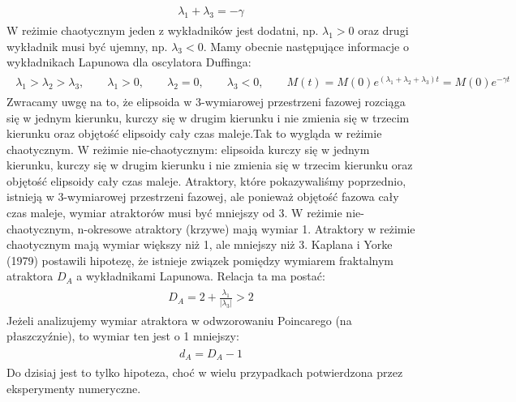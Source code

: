 \documentclass[a4paper,12pt,polish]{sphinxmanual}
\begin{document}
\label{ch2/chII012:equation-eqn16}\begin{gather}
\begin{split}\lambda_1 + \lambda_3 = -\gamma\end{split}\label{ch2/chII012-eqn16}
\end{gather}
W reżimie chaotycznym jeden z wykładników jest dodatni, np. $\lambda_1 >0$ oraz drugi wykładnik musi być ujemny, np. $\lambda_3 < 0$.  Mamy obecnie następujące informacje o wykładnikach Lapunowa dla oscylatora  Duffinga:
\label{ch2/chII012:equation-eqn17}\begin{gather}
\begin{split}\lambda_1  >  \lambda_2  >  \lambda_3, \qquad   \lambda_1 > 0, \qquad \lambda_2  = 0, \qquad   \lambda_3 < 0,  \qquad M(t) =  M(0)  e^{(\lambda_1 + \lambda_2 + \lambda_3) t} = M(0) e^{-\gamma t}\end{split}\label{ch2/chII012-eqn17}
\end{gather}
Zwracamy uwgę na to, że elipsoida  w 3-wymiarowej przestrzeni fazowej rozciąga się w jednym kierunku, kurczy się w drugim kierunku i nie zmienia się w trzecim kierunku  oraz objętość elipsoidy cały czas maleje.Tak to wygląda w reżimie chaotycznym. W reżimie nie-chaotycznym: elipsoida kurczy się  w jednym kierunku, kurczy się w drugim kierunku i nie zmienia się w trzecim kierunku  oraz objętość elipsoidy cały czas maleje. Atraktory, które pokazywaliśmy poprzednio, istnieją w 3-wymiarowej przestrzeni fazowej, ale ponieważ objętość fazowa cały czas maleje, wymiar atraktorów musi być mniejszy od 3. W reżimie nie-chaotycznym, n-okresowe atraktory  (krzywe) mają wymiar 1. Atraktory w reżimie chaotycznym mają wymiar większy niż 1, ale mniejszy niż 3. Kaplana i  Yorke (1979) postawili  hipotezę, że  istnieje związek pomiędzy wymiarem fraktalnym atraktora $D_A$  a wykładnikami Lapunowa. Relacja ta ma postać:
\label{ch2/chII012:equation-eqn18}\begin{gather}
\begin{split} D_A = 2 +  \frac{\lambda_1}{|\lambda_3|}  >  2\end{split}\label{ch2/chII012-eqn18}
\end{gather}
Jeżeli analizujemy wymiar atraktora w odwzorowaniu Poincarego (na płaszczyźnie), to wymiar ten jest o 1 mniejszy:
\label{ch2/chII012:equation-eqn19}\begin{gather}
\begin{split}d_A = D_A -1\end{split}\label{ch2/chII012-eqn19}
\end{gather}
Do dzisiaj jest to tylko hipoteza, choć w wielu przypadkach potwierdzona przez eksperymenty numeryczne.
\end{document}

